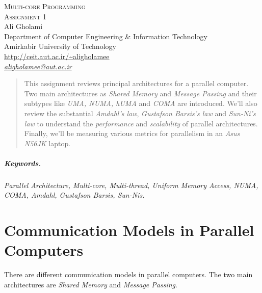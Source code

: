\documentclass[12pt]{article}
\numberwithin{equation}{section}
\numberwithin{table}{section}
\numberwithin{figure}{section}
\begin{document}

\begin{center}
\textsc{\Large Multi-core Programming} \\[2pt]
	\textsc{\large Assignment 1}\\
	\vspace{0.5cm}
  Ali Gholami \\[6pt]
  Department of Computer Engineering \& Information Technology\\
  Amirkabir University of Technology  \\[6pt]
  \def\UrlFont{\em}
  \url{http://ceit.aut.ac.ir/~aligholamee}\\
    \href{mailto:aligholamee@aut.ac.ir}{\textit{aligholamee@aut.ac.ir}}
\end{center}

\begin{abstract}
This assignment reviews principal architectures for a parallel computer. Two main architectures as \textit{Shared Memory} and \textit{Message Passing} and their subtypes like \textit{UMA, NUMA, hUMA} and \textit{COMA} are introduced. We'll also review the substantial \textit{Amdahl's law}, \textit{Gustafson Barsis's law} and \textit{Sun-Ni’s law} to understand the \textit{performance} and \textit{scalability} of parallel architectures. Finally, we'll be measuring various metrics for parallelism in an \textit{Asus N56JK} laptop.
\end{abstract}

\subparagraph{Keywords.} \textit{Parallel Architecture, Multi-core, Multi-thread, Uniform Memory Access, NUMA, COMA, Amdahl, Gustafson Barsis, Sun-Nis.}

\section{Communication Models in Parallel Computers}
There are different communication models in parallel computers. The two main architectures are \textit{Shared Memory} and \textit{Message Passing}.
\end{document}

